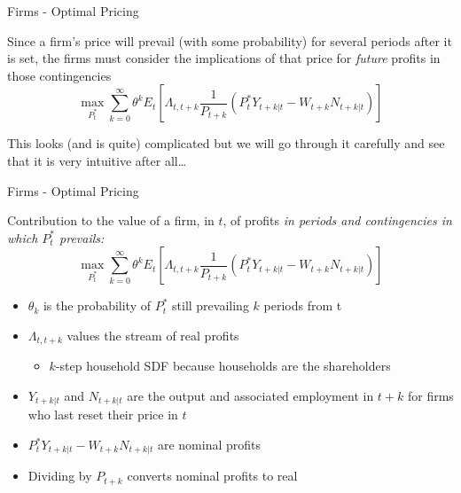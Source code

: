 \documentclass{beamer}
\begin{document}

	
\begin{frame}{Firms - Optimal Pricing}

Since a firm's price will prevail (with some probability) for several periods after it is set, the firms must consider the implications of that price for \emph{future} profits in those contingencies
\begin{equation*}
\max_{P_{t}^{\ast}} \sum\limits_{k=0}^{\infty} \theta^{k} E_{t} \left[ \Lambda_{t,t+k} \frac{1}{P_{t+k}} \left( P_{t}^{\ast} Y_{t+k|t} - W_{t+k}N_{t+k|t} \right) \right]
\end{equation*}

This looks (and is quite) complicated but we will go through it carefully and see that it is very intuitive after all\ldots

\end{frame}


	
\begin{frame}{Firms - Optimal Pricing}

Contribution to the value of a firm, in $t$, of profits \emph{in periods and contingencies in which $P_{t}^{\ast}$ prevails:}
\begin{equation*}
\max_{P_{t}^{\ast}} \sum\limits_{k=0}^{\infty} \theta^{k} E_{t} \left[ \Lambda_{t,t+k} \frac{1}{P_{t+k}} \left( P_{t}^{\ast} Y_{t+k|t} - W_{t+k}N_{t+k|t} \right) \right]
\end{equation*}
	
\begin{itemize}
\item	$\theta_{k}$ is the probability of $P_{t}^{\ast}$ still prevailing $k$ periods from t
\item	$\Lambda_{t,t+k}$ values the stream of real profits
	\begin{itemize}
	\item	$k$-step household SDF because households are the shareholders
	\end{itemize}
\item	$Y_{t+k|t}$ and $N_{t+k|t}$ are the output and associated employment in $t+k$ for firms who last reset their price in $t$
\item	$ P_{t}^{\ast} Y_{t+k|t} - W_{t+k}N_{t+k|t}$ are nominal profits
\item	Dividing by $P_{t+k}$ converts nominal profits to real
\end{itemize}


\end{frame}
\end{document}
